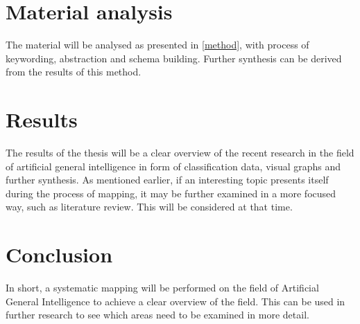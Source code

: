 \documentclass[utf8,english]{gradu3}
\begin{document}
\section{Material analysis}

The material will be analysed as presented in \ref{method}, with process of keywording, abstraction and schema building. Further synthesis can be derived from the results of this method.
\section{Results}
The results of the thesis will be a clear overview of the recent research in the field of artificial general intelligence in form of classification data, visual graphs and further synthesis. As mentioned earlier, if an interesting topic presents itself during the process of mapping, it may be further examined in a more focused way, such as literature review. This will be considered at that time.

\section{Conclusion}
In short, a systematic mapping will be performed on the field of Artificial General Intelligence to achieve a clear overview of the field. This can be used in further research to see which areas need to be examined in more detail.


\printbibliography
\end{document}
